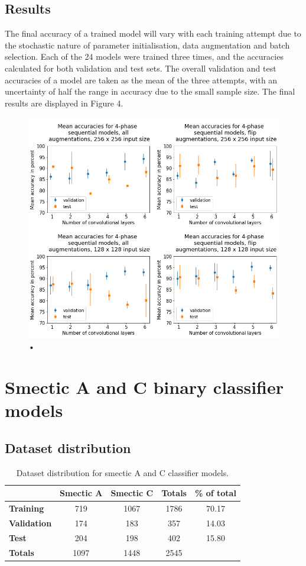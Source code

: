 \documentclass[12pt]{article}
\begin{document}
\subsection{Results}
The final accuracy of a trained model will vary with each training attempt due to the stochastic nature of parameter initialisation, data augmentation and batch selection. Each of the 24 models were trained three times, and the accuracies calculated for both validation and test sets. The overall validation and test accuracies of a model are taken as the mean of the three attempts, with an uncertainty of half the range in accuracy due to the small sample size. The final results are displayed in Figure 4.
\begin{figure}[h]
	\centering
    \includegraphics[width=6.6in]{images/4-phase_graphs.png}
    \caption{•}
\end{figure} 
\section{Smectic A and C binary classifier models}
\subsection{Dataset distribution}
\begin{table}[h]
\begin{center}
\caption{Dataset distribution for smectic A and C classifier models.}
\begin{tabular}{l|c|c|c|c}
\toprule
& \textbf{Smectic A} & \textbf{Smectic C} & \textbf{Totals} & \textbf{\% of total}\\
\midrule
\textbf{Training} & 719 & 1067 & 1786 & 70.17\\
\textbf{Validation} & 174 & 183 & 357 & 14.03\\
\textbf{Test} & 204 & 198 & 402 & 15.80\\
\midrule
\textbf{Totals} & 1097 & 1448 & 2545\\
\bottomrule
\end{tabular}
\end{center}
\end{table}
\end{document}
